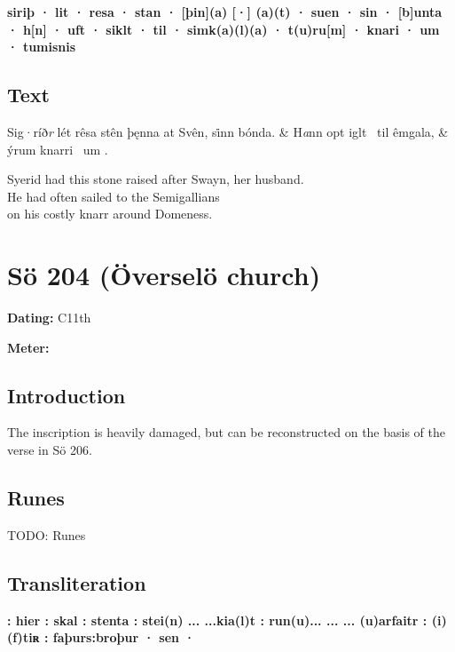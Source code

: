 \textbf{siriþ · lit · resa · stan · [þin](a) [·] (a)(t) · suen · sin · [b]unta · h[n] · uft · siklt · til · simk(a)(l)(a) · t(u)ru[m] · knari · um · tumisnis}

\subsection{Text}

\bvg\bva[]%
Sig·ríð\emph{r} lét rêsa stên þęnna at Svên, si̇nn bónda. &
H\emph{a}nn opt iglt \hld\ til êmgala, &
ýrum knarri \hld\ um .\eva

\bvb Syerid had this stone raised after Swayn, her husband. \\
He had often sailed to the Semigallians \\
on his costly knarr around Domeness.\evb\evg

\sectionline\clearpage


\section{Sö 204 (Överselö church)}

\begin{flushright}%
\textbf{Dating:} C11th

\textbf{Meter:} \Fornyrdislag
\end{flushright}%

\subsection{Introduction}

The inscription is heavily damaged, but can be reconstructed on the basis of the verse in Sö 206.

\subsection{Runes}

TODO: Runes%

\subsection{Transliteration}

\textbf{: hier : skal : stenta : stei(n) ... ...kia(l)t : run(u)... ... ... (u)arfaitr : (i)(f)tiʀ : faþurs:broþur · sen ·}

